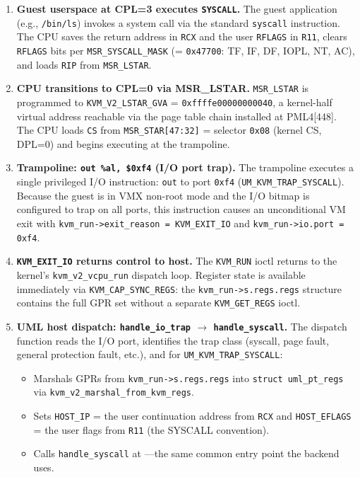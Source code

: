 \begin{enumerate}[leftmargin=2em]
  \item \textbf{Guest userspace at CPL=3 executes \texttt{SYSCALL}.}
    The guest application (e.g., \texttt{/bin/ls}) invokes a system call via
    the standard \texttt{syscall} instruction.  The CPU saves the return
    address in \texttt{RCX} and the user \texttt{RFLAGS} in \texttt{R11},
    clears \texttt{RFLAGS} bits per \texttt{MSR\_SYSCALL\_MASK} (= \texttt{0x47700}:
    TF, IF, DF, IOPL, NT, AC), and loads \texttt{RIP} from
    \texttt{MSR\_LSTAR}.

  \item \textbf{CPU transitions to CPL=0 via MSR\_LSTAR.}
    \texttt{MSR\_LSTAR} is programmed to \texttt{KVM\_V2\_LSTAR\_GVA} =
    \texttt{0xffffe00000000040}, a kernel-half virtual address reachable via
    the page table chain installed at PML4[448].  The CPU loads
    \texttt{CS} from \texttt{MSR\_STAR[47:32]} = selector \texttt{0x08}
    (kernel CS, DPL=0) and begins executing at the trampoline.

  \item \textbf{Trampoline: \texttt{out \%al, \$0xf4} (I/O port trap).}
    The trampoline executes a single privileged I/O instruction: \texttt{out}
    to port \texttt{0xf4} (\texttt{UM\_KVM\_TRAP\_SYSCALL}).  Because the
    guest is in VMX non-root mode and the I/O bitmap is configured to trap
    on all ports, this instruction causes an unconditional VM exit with
    \texttt{kvm\_run->exit\_reason = KVM\_EXIT\_IO} and
    \texttt{kvm\_run->io.port = 0xf4}.

  \item \textbf{\texttt{KVM\_EXIT\_IO} returns control to host.}
    The \texttt{KVM\_RUN} ioctl returns to the \UML{} kernel's
    \texttt{kvm\_v2\_vcpu\_run} dispatch loop.  Register state is available
    immediately via \texttt{KVM\_CAP\_SYNC\_REGS}: the
    \texttt{kvm\_run->s.regs.regs} structure contains the full GPR set
    without a separate \texttt{KVM\_GET\_REGS} ioctl.

  \item \textbf{UML host dispatch: \texttt{handle\_io\_trap} $\to$
        \texttt{handle\_syscall}.}
    The dispatch function reads the I/O port, identifies the trap class
    (syscall, page fault, general protection fault, etc.), and for
    \texttt{UM\_KVM\_TRAP\_SYSCALL}:
    \begin{itemize}
      \item Marshals GPRs from \texttt{kvm\_run->s.regs.regs} into
            \texttt{struct uml\_pt\_regs} via
            \texttt{kvm\_v2\_marshal\_from\_kvm\_regs}.
      \item Sets \texttt{HOST\_IP} = the user continuation address from
            \texttt{RCX} and \texttt{HOST\_EFLAGS} = the user flags from
            \texttt{R11} (the SYSCALL convention).
      \item Calls \texttt{handle\_syscall} at
            ---the same common
            entry point the \Seccomp{} backend uses.
    \end{itemize}


\end{enumerate}
